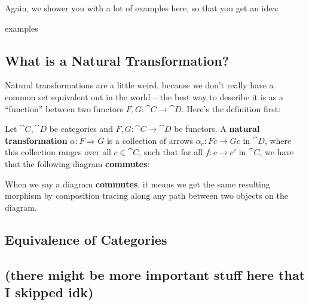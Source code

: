 Again, we shower you with a lot of examples here, so that you get an idea:
\begin{example}
  examples
\end{example}


\subsection{What is a Natural Transformation?}
Natural transformations are a little weird, because we don't really have a common set equivalent out in the world -- the best way to describe it is as a ``function'' between two functors $F, G : \cat C \to \cat D$. Here's the definition first:
\begin{definition}
  Let $\cat C, \cat D$ be categories and $F, G : \cat C \to \cat D$ be functors. A \textbf{natural transformation} $\alpha : F \Rightarrow G$ is a collection of arrows $\alpha_c : Fc \to Gc$ in $\cat D$, where this collection ranges over all $c \in \cat C$, such that for all $f : c \to c'$ in $\cat C$, we have that the following diagram \textbf{commutes}:
  \begin{center}
  \end{center}
  When we say a diagram \textbf{commutes}, it means we get the same resulting morphism by composition tracing along any path between two objects on the diagram.
\end{definition}

\subsection{Equivalence of Categories}

\subsection{(there might be more important stuff here that I skipped idk)}